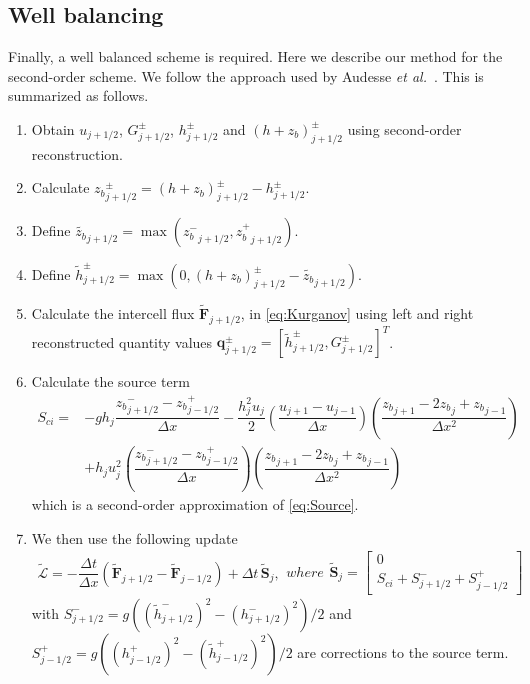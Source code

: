 \documentclass[preprint,sort&compress,1p]{article}
\begin{document}
\subsection{Well balancing}\label{section:Well Balancing}

Finally, a well balanced scheme is required. Here we describe our method for the second-order scheme. We follow the approach used by Audesse \emph{et al.}~\cite{Audesse-etal-2004-2050}. This is summarized as follows.
\begin{enumerate}
  \item Obtain $u_{j+1/2}$, $G^\pm_{j+1/2}$, $h^\pm_{j+1/2}$ and $(h + z_b)^\pm_{j+1/2}$ using second-order reconstruction.
  \item Calculate ${z_b}^\pm_{j+1/2} = (h + z_b)^\pm_{j+1/2} - h^\pm_{j+1/2}$.
  \item Define $\widetilde{z_b}_{j+1/2} = \max\left( {z_b^-}_{j+1/2}, {z_b^+}_{j+1/2} \right)$.
  \item Define $\widetilde{h}^\pm_{j+1/2} = \max\left(0,(h+z_b)^\pm_{j+1/2} - \widetilde{z_b}_{j+1/2} \right)$.
  \item Calculate the intercell flux $\widetilde{\mathbf{F}}_{j+1/2}$, in  \eqref{eq:Kurganov} using left and right reconstructed quantity values $\mathbf{q}^{\pm}_{j+1/2} = [\widetilde{h}^\pm_{j+1/2}, G^\pm_{j+1/2}]^T$.
  \item Calculate the source term
    \begin{align}
    S_{ci} = &-g h_j \dfrac{{z_b}^-_{j+1/2} - {z_b}^+_{j-1/2}}{\Delta x} - \dfrac{h_j^2 u_j}{2}  \left ( \dfrac{u_{j+1} - u_{j-1}}{\Delta x }\right ) \left ( \dfrac{{z_b}_{j+1} - 2 {z_b}_j + {z_b}_{j-1}}{\Delta x^2} \right ) \nonumber \\
    &+  h_j u_j^2 \left ( \dfrac{{z_b}^-_{j+1/2} - {z_b}^+_{j-1/2}}{\Delta x}\right ) \left ( \dfrac{{z_b}_{j+1} - 2 {z_b}_j + {z_b}_{j-1}}{\Delta x^2} \right )
    \end{align}
which is a second-order approximation of \eqref{eq:Source}.
  \item We then use the following update
\begin{subequations}
 \begin{align}
\label{eq:L_operator_tilde}
\widetilde{\mathcal{L}} =
- \dfrac{\Delta t}{\Delta x} \left (\widetilde{\mathbf{F}}_{j+1/2}- \widetilde{\mathbf{F}}_{j-1/2}\right ) + \Delta t \,\widetilde{\mathbf{S}}_j ,
\end{align}
where
 \begin{align}
 \widetilde{\mathbf{S}}_j  =
 \begin{bmatrix}
 0 \\
S_{ci} + S^-_{j+1/2} + S^+_{j-1/2}
\end{bmatrix}
\end{align}
\end{subequations}
with
$S^-_{j+1/2} = g \left ( ( \widetilde{h}^-_{j+1/2} )^2 - \left( h^-_{j+1/2} \right)^2 \right )/2$ and
$S^+_{j-1/2} = g \left ( ( h^+_{j-1/2} )^2 - ( \widetilde{h}^+_{j-1/2})^2 \right )/2$ are corrections to the source term.
\end{enumerate}
\end{document}
